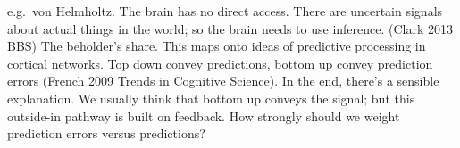 \begin{enumerate}[start=4]
\begin{enumerate}
\begin{itemize}
  e.g.~von Helmholtz.  The brain has no direct access.  There are
  uncertain signals about actual things in the world; so the brain
  needs to use inference.  (Clark 2013 BBS) The beholder's share.
  This maps onto ideas of predictive processing in cortical networks.
  Top down convey predictions, bottom up convey prediction errors
  (French 2009 Trends in Cognitive Science).  In the end, there's a
  sensible explanation.  We usually think that bottom up conveys the
  signal; but this outside-in pathway is built on feedback.  How
  strongly should we weight prediction errors versus predictions?
\end{itemize}
\end{enumerate}
\end{enumerate}

